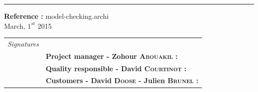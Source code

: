 \documentclass{report}
\begin{document}
\begin{titlepage}


\vspace*{4.5cm}

\noindent
\begin{minipage}{0.35\linewidth}
    \begin{flushright}
        \printauthor
    \end{flushright}
\end{minipage} \hspace{15pt}
%
\begin{minipage}{0.02\linewidth}
    \rule{1pt}{175pt}
\end{minipage} \hspace{-10pt}
%
\begin{minipage}{0.6\linewidth}
\vspace{5pt}
\newenvironment{test}{\begin{center}}{\end{center}}
\hspace{10pt}
\begin{minipage}{\linewidth} 
\textbf{Reference :} model-checking.archi ~\\
March, $1^{st}$ 2015
\end{minipage}
\end{minipage}

\vspace{8cm}
\begin{minipage}{0.20\linewidth}
    \begin{flushright}
       
        \begin{tabular}{ll}
	 \textit{Signatures} & \\
			& \textbf{Project manager - Zohour \textsc{Abouakil} :} \\
            & \textbf{Quality responsible - David \textsc{Courtinot} :} \\
            & \textbf{Customers - David \textsc{Doose} - Julien \textsc{Brunel} :} \\
        \end{tabular}
    \end{flushright}
\end{minipage}

\end{titlepage}
\restoregeometry
\tableofcontents
{}
\end{document}
